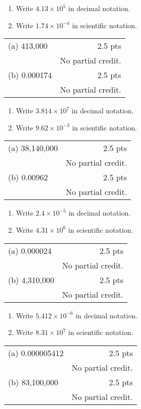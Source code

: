 {
	\begin{enumerate}
	\item Write $4.13\times 10^{5}$ in decimal notation.
	\begin{onlyproblem}\spc\end{onlyproblem}
	\item Write $1.74\times 10^{-4}$ in scientific notation.
	\end{enumerate}
}
{
	\begin{tabular}{l r}
	(a) 413,000 &  2.5 pts\\
	& No partial credit.\\
	(b) 0.000174 & 2.5 pts\\
	& No partial credit.
	\end{tabular}
}

{
	\begin{enumerate}
	\item Write $3.814\times 10^{7}$ in decimal notation.
	\begin{onlyproblem}\spc\end{onlyproblem}
	\item Write $9.62\times 10^{-3}$ in scientific notation.
	\end{enumerate}
}
{
	\begin{tabular}{l r}
	(a) 38,140,000 &  2.5 pts\\
	& No partial credit.\\
	(b) 0.00962 & 2.5 pts\\
	& No partial credit.
	\end{tabular}
}

{
	\begin{enumerate}
	\item Write $2.4\times 10^{-5}$ in decimal notation.
	\begin{onlyproblem}\spc\end{onlyproblem}
	\item Write $4.31\times 10^{6}$ in scientific notation.
	\end{enumerate}
}
{
	\begin{tabular}{l r}
	(a) 0.000024 &  2.5 pts\\
	& No partial credit.\\
	(b) 4,310,000 & 2.5 pts\\
	& No partial credit.
	\end{tabular}
}

{
	\begin{enumerate}
	\item Write $5.412\times 10^{-6}$ in decimal notation.
	\begin{onlyproblem}\spc\end{onlyproblem}
	\item Write $8.31\times 10^{7}$ in scientific notation.
	\end{enumerate}
}
{
	\begin{tabular}{l r}
	(a) 0.000005412&  2.5 pts\\
	& No partial credit.\\
	(b) 83,100,000 & 2.5 pts\\
	& No partial credit.
	\end{tabular}
}
